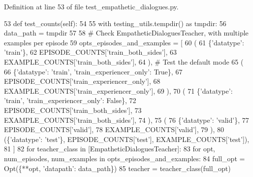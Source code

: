 Definition at line 53 of file test\+\_\+empathetic\+\_\+dialogues.\+py.


\begin{DoxyCode}
53     \textcolor{keyword}{def }test\_counts(self):
54 
55         with testing\_utils.tempdir() \textcolor{keyword}{as} tmpdir:
56             data\_path = tmpdir
57 
58             \textcolor{comment}{# Check EmpatheticDialoguesTeacher, with multiple examples per episode}
59             opts\_episodes\_and\_examples = [
60                 (
61                     \{\textcolor{stringliteral}{'datatype'}: \textcolor{stringliteral}{'train'}\},
62                     EPISODE\_COUNTS[\textcolor{stringliteral}{'train\_both\_sides'}],
63                     EXAMPLE\_COUNTS[\textcolor{stringliteral}{'train\_both\_sides'}],
64                 ),  \textcolor{comment}{# Test the default mode}
65                 (
66                     \{\textcolor{stringliteral}{'datatype'}: \textcolor{stringliteral}{'train'}, \textcolor{stringliteral}{'train\_experiencer\_only'}: \textcolor{keyword}{True}\},
67                     EPISODE\_COUNTS[\textcolor{stringliteral}{'train\_experiencer\_only'}],
68                     EXAMPLE\_COUNTS[\textcolor{stringliteral}{'train\_experiencer\_only'}],
69                 ),
70                 (
71                     \{\textcolor{stringliteral}{'datatype'}: \textcolor{stringliteral}{'train'}, \textcolor{stringliteral}{'train\_experiencer\_only'}: \textcolor{keyword}{False}\},
72                     EPISODE\_COUNTS[\textcolor{stringliteral}{'train\_both\_sides'}],
73                     EXAMPLE\_COUNTS[\textcolor{stringliteral}{'train\_both\_sides'}],
74                 ),
75                 (
76                     \{\textcolor{stringliteral}{'datatype'}: \textcolor{stringliteral}{'valid'}\},
77                     EPISODE\_COUNTS[\textcolor{stringliteral}{'valid'}],
78                     EXAMPLE\_COUNTS[\textcolor{stringliteral}{'valid'}],
79                 ),
80                 (\{\textcolor{stringliteral}{'datatype'}: \textcolor{stringliteral}{'test'}\}, EPISODE\_COUNTS[\textcolor{stringliteral}{'test'}], EXAMPLE\_COUNTS[\textcolor{stringliteral}{'test'}]),
81             ]
82             \textcolor{keywordflow}{for} teacher\_class \textcolor{keywordflow}{in} [EmpatheticDialoguesTeacher]:
83                 \textcolor{keywordflow}{for} opt, num\_episodes, num\_examples \textcolor{keywordflow}{in} opts\_episodes\_and\_examples:
84                     full\_opt = Opt(\{**opt, \textcolor{stringliteral}{'datapath'}: data\_path\})
85                     teacher = teacher\_class(full\_opt)

\end{DoxyCode}
